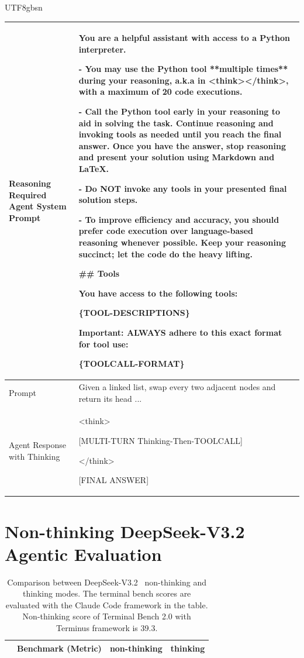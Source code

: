 \documentclass[11pt, a4paper, logo, copyright, nonumbering]{deepseek}
\def\newmodel{DeepSeek-V3.2}
\begin{document}
\begin{CJK*}{UTF8}{gbsn}
\begin{table}[htbp]
\begin{minipage}{\textwidth}
\begin{tabular}{p{}|p{}}
    Reasoning Required Agent System Prompt & You are a helpful assistant with access to a Python interpreter.
    
- You may use the Python tool **multiple times** during your reasoning, a.k.a in <think></think>, with a maximum of 20 code executions.

- Call the Python tool early in your reasoning to aid in solving the task. Continue reasoning and invoking tools as needed until you reach the final answer. Once you have the answer, stop reasoning and present your solution using Markdown and LaTeX.

- Do NOT invoke any tools in your presented final solution steps.

- To improve efficiency and accuracy, you should prefer code execution over language-based reasoning whenever possible. Keep your reasoning succinct; let the code do the heavy lifting.

    \#\# Tools
    
You have access to the following tools:

\{TOOL-DESCRIPTIONS\}

  Important: ALWAYS adhere to this exact format for tool use:

\{TOOLCALL-FORMAT\}

\\ \hline
    Prompt & Given a linked list, swap every two adjacent nodes and return its head ... \\ \hline
    Agent Response with Thinking &
    <think> 
    
    [MULTI-TURN Thinking-Then-TOOLCALL]

</think>
    
    [FINAL ANSWER]  \\ 
     \bottomrule
    \end{tabular}

    \end{minipage}

\end{table}
\newpage
\section{Non-thinking \newmodel~ Agentic Evaluation }
\begin{table}[htbp]
    \centering
    \footnotesize
    \setlength{\tabcolsep}{1.9pt}
    \caption{ Comparison between \newmodel~ non-thinking and thinking modes. The terminal bench scores are evaluated with the Claude Code framework in the table. Non-thinking score of Terminal Bench 2.0 with Terminus framework is 39.3. 
      }
    \begin{tabular}{@{}c l | c  c  }
    \toprule
    & \multirow{1}{*}{\centering \textbf{Benchmark {\tiny (Metric)}}}  & \textbf{non-thinking}  & \textbf{thinking}
\\
    \midrule


\end{tabular}
\end{table}
\end{CJK*}
\end{document}
